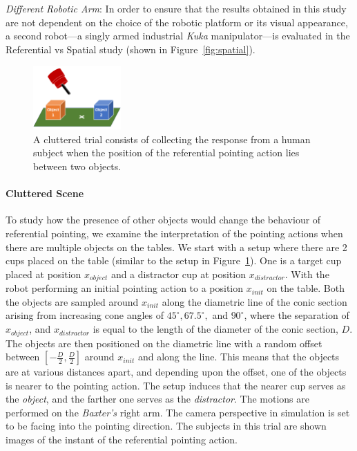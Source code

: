 \noindent\textit{Different Robotic Arm}:
In order to ensure that the results obtained in this study are not dependent on the choice of the robotic platform or its visual appearance, a second robot---a singly armed industrial \textit{Kuka} manipulator---is evaluated in the Referential vs Spatial study (shown in Figure~\ref{fig:spatial}).

\begin{figure}[t]
    \centering
    \includegraphics[width=0.3\textwidth]{figures/clutter_trial.png}
    \caption{A cluttered trial consists of collecting the response from a human subject when the position of the referential pointing action lies between two objects.}
    \label{fig:cluttered_trial}
\end{figure}

\paragraph{Cluttered Scene}
To study how the presence of other objects would change the behaviour of referential pointing, we examine the interpretation of the pointing actions when there are multiple objects on the tables. We start with a setup where there are 2 cups placed on the table (similar to the setup in Figure~\ref{fig:cluttered_trial}). One is a target cup placed at position $x_{object}$ and a distractor cup at position $x_{distractor}$. With the robot performing an initial pointing action to a position $x_{init}$ on the table. Both the objects are sampled around $x_{init}$ along the diametric line of the conic section arising from increasing cone angles of $45^\circ, 67.5^\circ, $ and $90^\circ$, where the separation of $x_{object}$, and $x_{distractor}$ is equal to the length of the diameter of the conic section, $D$. The objects are then positioned on the diametric line with a random offset between $[-\frac{D}{2}, \frac{D}{2}]$ around $x_{init}$ and along the line. This means that the objects are at various distances apart, and depending upon the offset, one of the objects is nearer to the pointing action. The setup induces that the nearer cup serves as the \textit{object}, and the farther one serves as the \textit{distractor}. The motions are performed on the \textit{Baxter's} right arm. The camera perspective in simulation is set to be facing into the pointing direction. The subjects in this trial are shown images of the instant of the referential pointing action.




